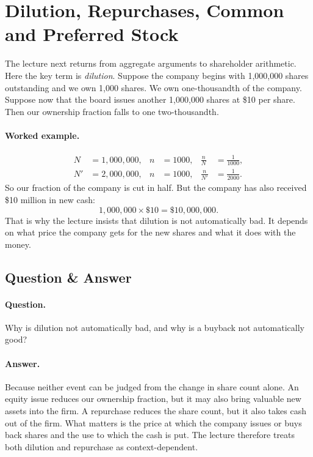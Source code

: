 \section{Dilution, Repurchases, Common and Preferred Stock}

The lecture next returns from aggregate arguments to shareholder arithmetic. Here the key term is \emph{dilution}. Suppose the company begins with 1,000,000 shares outstanding and we own 1,000 shares. We own one-thousandth of the company. Suppose now that the board issues another 1,000,000 shares at \$10 per share. Then our ownership fraction falls to one two-thousandth.

\paragraph{Worked example.}
\begin{align}
N &= 1{,}000{,}000, & n &= 1000, & \frac{n}{N} &= \frac{1}{1000},\\
N' &= 2{,}000{,}000, & n &= 1000, & \frac{n}{N'} &= \frac{1}{2000}.
\end{align}
So our fraction of the company is cut in half. But the company has also received \$10 million in new cash:
\begin{equation}
1{,}000{,}000 \times \$10 = \$10{,}000{,}000.
\end{equation}
That is why the lecture insists that dilution is not automatically bad. It depends on what price the company gets for the new shares and what it does with the money.

\subsection{Question \& Answer}

\paragraph{Question.} Why is dilution not automatically bad, and why is a buyback not automatically good?

\paragraph{Answer.} Because neither event can be judged from the change in share count alone. An equity issue reduces our ownership fraction, but it may also bring valuable new assets into the firm. A repurchase reduces the share count, but it also takes cash out of the firm. What matters is the price at which the company issues or buys back shares and the use to which the cash is put. The lecture therefore treats both dilution and repurchase as context-dependent.

